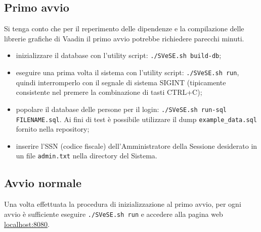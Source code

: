 \subsection{Primo avvio}
Si tenga conto che per il reperimento delle dipendenze e la compilazione delle librerie grafiche di Vaadin il primo avvio potrebbe richiedere parecchi minuti.
\begin{itemize}
	\item inizializzare il database con l'utility script: \verb!./SVeSE.sh build-db!;
	\item eseguire una prima volta il sistema con l'utility script: \verb!./SVeSE.sh run!, quindi interromperlo con il segnale di sistema SIGINT (tipicamente consistente nel premere la combinazione di tasti CTRL+C);
	\item popolare il database delle persone per il login: \verb!./SVeSE.sh run-sql FILENAME.sql!. Ai fini di test è possibile utilizzare il dump \verb!example_data.sql! fornito nella repository;
	\item inserire l'SSN (codice fiscale) dell'Amministratore della Sessione desiderato in un file \verb!admin.txt! nella directory del Sistema.
\end{itemize}

\subsection{Avvio normale}
Una volta effettuata la procedura di inizializzazione al primo avvio, per ogni avvio è sufficiente eseguire \verb!./SVeSE.sh run! e accedere alla pagina web \url{localhost:8080}.
